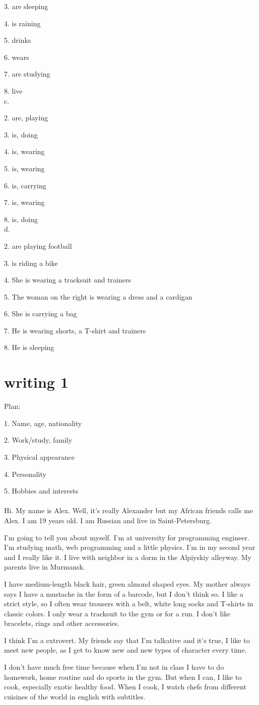 \documentclass{article}
\begin{document}
3. are sleeping

4. is raining

5. drinks

6. wears

7. are studying

8. live
\\
c. 

2. are, playing 

3. is, doing

4. is, wearing

5. is, wearing

6. is, carrying

7. is, wearing

8. is, doing
\\
d. 

2. are playing football

3. is riding a bike

4. She is wearing a tracksuit and trainers

5. The woman on the right is wearing a dress and a cardigan

6. She is carrying a bag

7. He is wearing shorts, a T-shirt and trainers

8. He is sleeping

\section{writing 1}
Plan:

1. Name, age, nationality

2. Work/study, family

3. Physical appearance

4. Personality

5. Hobbies and interests
\\ \\


Hi. My name is Alex. Well, it's really Alexander but my African friends calls me Alex. I am 19 years old. I am Russian and live in Saint-Petersburg.


I'm going to tell you about myself. I'm at university for programming engineer. I'm studying math, web programming and a little physics. I'm in my second year and I really like it. I live with neighbor in a dorm in the Alpiyskiy alleyway. My parents live in Murmansk.

I have medium-length black hair, green almond shaped eyes. My mother always says I have a mustache in the form of a barcode, but I don't think so. I like a strict style, so I often wear trousers with a belt, white long socks and T-shirts in classic colors. I only wear a tracksuit to the gym or for a run. I don't like bracelets, rings and other accessories.


I think I'm a extrovert. My friends say that  I'm talkative and it's true, I like to meet new people, as I get to know new and new types of character every time.

I don't have much free time because when I'm not in class I have to do homework, home routine and do sports in the gym. But when I can, I like to cook, especially exotic healthy food. When I cook, I watch chefs from different cuisines of the world in english with subtitles.
\end{document}
